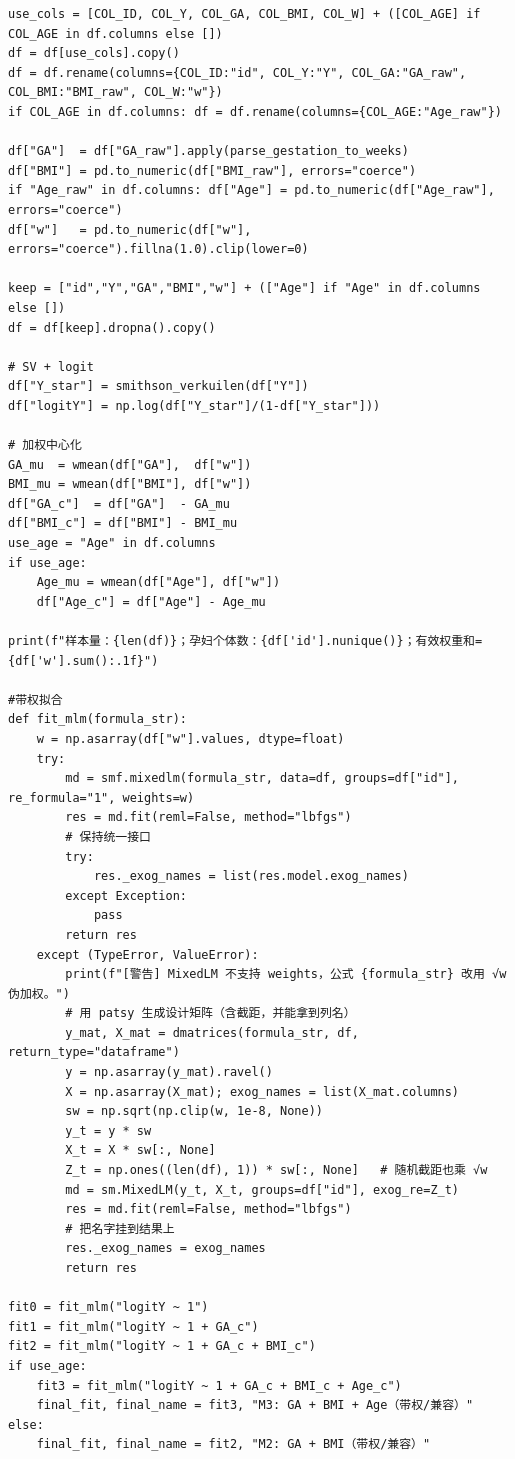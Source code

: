 \begin{lstlisting}
use_cols = [COL_ID, COL_Y, COL_GA, COL_BMI, COL_W] + ([COL_AGE] if COL_AGE in df.columns else [])
df = df[use_cols].copy()
df = df.rename(columns={COL_ID:"id", COL_Y:"Y", COL_GA:"GA_raw", COL_BMI:"BMI_raw", COL_W:"w"})
if COL_AGE in df.columns: df = df.rename(columns={COL_AGE:"Age_raw"})

df["GA"]  = df["GA_raw"].apply(parse_gestation_to_weeks)
df["BMI"] = pd.to_numeric(df["BMI_raw"], errors="coerce")
if "Age_raw" in df.columns: df["Age"] = pd.to_numeric(df["Age_raw"], errors="coerce")
df["w"]   = pd.to_numeric(df["w"], errors="coerce").fillna(1.0).clip(lower=0)

keep = ["id","Y","GA","BMI","w"] + (["Age"] if "Age" in df.columns else [])
df = df[keep].dropna().copy()

# SV + logit
df["Y_star"] = smithson_verkuilen(df["Y"])
df["logitY"] = np.log(df["Y_star"]/(1-df["Y_star"]))

# 加权中心化
GA_mu  = wmean(df["GA"],  df["w"])
BMI_mu = wmean(df["BMI"], df["w"])
df["GA_c"]  = df["GA"]  - GA_mu
df["BMI_c"] = df["BMI"] - BMI_mu
use_age = "Age" in df.columns
if use_age:
    Age_mu = wmean(df["Age"], df["w"])
    df["Age_c"] = df["Age"] - Age_mu

print(f"样本量：{len(df)}；孕妇个体数：{df['id'].nunique()}；有效权重和={df['w'].sum():.1f}")

#带权拟合
def fit_mlm(formula_str):
    w = np.asarray(df["w"].values, dtype=float)
    try:
        md = smf.mixedlm(formula_str, data=df, groups=df["id"], re_formula="1", weights=w)
        res = md.fit(reml=False, method="lbfgs")
        # 保持统一接口
        try:
            res._exog_names = list(res.model.exog_names)
        except Exception:
            pass
        return res
    except (TypeError, ValueError):
        print(f"[警告] MixedLM 不支持 weights，公式 {formula_str} 改用 √w 伪加权。")
        # 用 patsy 生成设计矩阵（含截距，并能拿到列名）
        y_mat, X_mat = dmatrices(formula_str, df, return_type="dataframe")
        y = np.asarray(y_mat).ravel()
        X = np.asarray(X_mat); exog_names = list(X_mat.columns)
        sw = np.sqrt(np.clip(w, 1e-8, None))
        y_t = y * sw
        X_t = X * sw[:, None]
        Z_t = np.ones((len(df), 1)) * sw[:, None]   # 随机截距也乘 √w
        md = sm.MixedLM(y_t, X_t, groups=df["id"], exog_re=Z_t)
        res = md.fit(reml=False, method="lbfgs")
        # 把名字挂到结果上
        res._exog_names = exog_names
        return res

fit0 = fit_mlm("logitY ~ 1")
fit1 = fit_mlm("logitY ~ 1 + GA_c")
fit2 = fit_mlm("logitY ~ 1 + GA_c + BMI_c")
if use_age:
    fit3 = fit_mlm("logitY ~ 1 + GA_c + BMI_c + Age_c")
    final_fit, final_name = fit3, "M3: GA + BMI + Age（带权/兼容）"
else:
    final_fit, final_name = fit2, "M2: GA + BMI（带权/兼容）"


\end{lstlisting}
